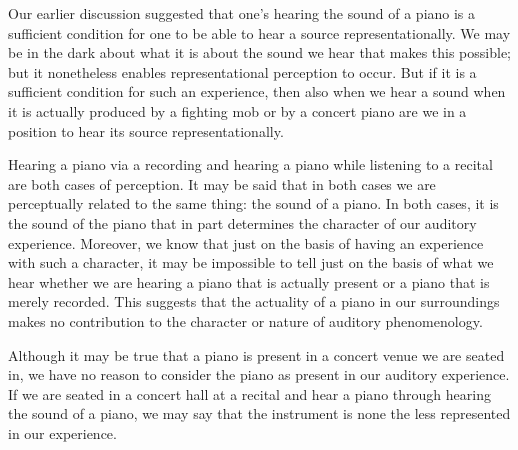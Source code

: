 \documentclass[sloppy, journal, git, bytitle, dodraft]{humapap}
\begin{document}
Our earlier discussion suggested that one's hearing the sound of a piano is a sufficient condition for one to be able to hear a source representationally. We may be in the dark about what it is about the sound we hear that makes this possible; but it nonetheless enables representational perception to occur. But if it is a sufficient condition for such an experience, then also when we hear a sound when it is actually produced by a fighting mob or by a concert piano are we in a position to hear its source representationally. 

Hearing a piano via a recording and hearing a piano while listening to a recital are both cases of perception. It may be said that in both cases we are perceptually related to the same thing: the sound of a piano. In both cases, it is the sound of the piano that in part determines the character of our auditory experience. Moreover, we know that just on the basis of having an experience with such a character, it may be impossible to tell just on the basis of what we hear whether we are hearing a piano that is actually present or a piano that is merely recorded. This suggests that the actuality of a piano in our surroundings makes no contribution to the character or nature of auditory phenomenology. 

Although it may be true that a piano is present in a concert venue we are seated in, we have no reason to consider the piano as present in our auditory experience.  If we are seated in a concert hall at a recital and hear a piano through hearing the sound of a piano, we may say that the instrument is none the less represented in our experience.  


\end{document}
